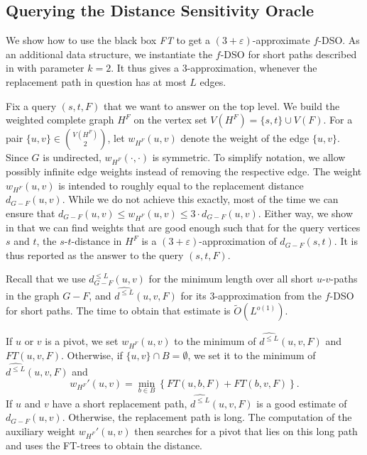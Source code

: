 \documentclass{theoretics}
\newcommand*{\Otilde}{\widetilde{O}}
\renewcommand{\le}{\leqslant}
\newcommand{\eps}{\varepsilon}
\begin{document}
\subsection{Querying the Distance Sensitivity Oracle}
\label{subsec:sublinear_algorithm}

We show how to use the black box \emph{FT} to get a $(3{+}\eps)$-approximate $f$-DSO.
As an additional data structure, we instantiate the $f$-DSO for short paths described in  with parameter $k = 2$.
It thus gives a $3$-approximation, whenever the replacement path in question
has at most $L$ edges.

Fix a query $(s,t,F)$ that we want to answer on the top level.
We build the weighted complete graph $H^F$ 
on the vertex set $V(H^F) = \{s,t\} \cup V(F)$.
For a pair $\{u,v\} \in \binom{V(H^F)}{2}$, let $w_{H^F}(u,v)$ denote the weight of the edge $\{u,v\}$.
Since $G$ is undirected, $w_{H^F}(\cdot,\cdot)$ is symmetric.
To simplify notation, we allow possibly infinite edge weights instead of removing the respective edge.
The weight $w_{H^F}(u,v)$ is intended to roughly equal  to the replacement distance $d_{G-F}(u,v)$.
While we do not achieve this exactly,
most of the time we can ensure that 
$d_{G-F}(u,v) \le w_{H^F}(u,v) \le 3 \cdot d_{G-F}(u,v)$.
Either way,
we show in  that we can find weights that are good enough
such that for the query vertices $s$ and $t$,
the $s$-$t$-distance in $H^F$ is a $(3{+}\varepsilon)$-approximation
of $d_{G-F}(s,t)$.
It is thus reported as the answer to the query $(s,t,F)$.

Recall that we use $d_{G-F}^{\le L}(u,v)$ for the minimum length
over all short $u$-$v$-paths in the graph $G{-}F$, 
and $\widehat{d^{\le L}}(u,v,F)$ for its $3$-approximation 
from the $f$-DSO for short paths.
The time to obtain that estimate is $\Otilde(L^{o(1)})$.

If $u$ or $v$ is a pivot, we set $w_{H^F}(u,v)$ 
to the minimum of $\widehat{d^{\le L}}(u,v,F)$ and $FT(u,v,F)$.
Otherwise, if $\{u,v\} \cap B = \emptyset$,
we set it to the minimum of $\widehat{d^{\le L}}(u,v,F)$ and 
\begin{equation*}
  w_{H^F}'(u,v)=\min_{b \in B}\left\{FT(u,b,F)+FT(b,v,F)\right\}.
\end{equation*}
If $u$ and $v$ have a short replacement path,
$\widehat{d^{\le L}}(u,v,F)$ is a good estimate of $d_{G-F}(u,v)$.
Otherwise, the replacement path is long.
The computation of the auxiliary weight $w_{H^F}'(u,v)$ then searches
for a pivot that lies on this long path and uses the FT-trees
to obtain the distance.
\end{document}
